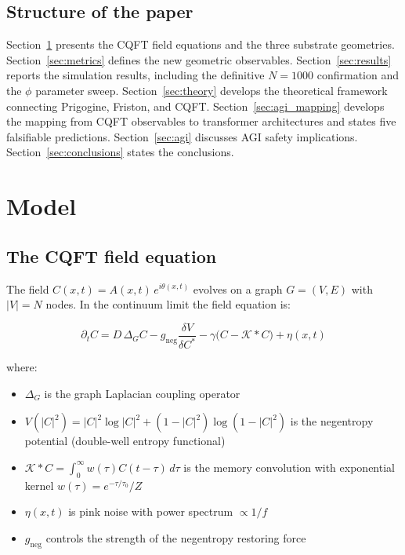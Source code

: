 \documentclass[12pt,a4paper]{article}
\theoremstyle{plain}
\theoremstyle{definition}
\begin{document}
\subsection{Structure of the paper}

Section~\ref{sec:model} presents the CQFT field equations and the three
substrate geometries. Section~\ref{sec:metrics} defines the new geometric
observables. Section~\ref{sec:results} reports the simulation results,
including the definitive $N=1000$ confirmation and the $\phi$ parameter sweep.
Section~\ref{sec:theory} develops the theoretical framework connecting
Prigogine, Friston, and CQFT.
Section~\ref{sec:agi_mapping} develops the mapping from CQFT observables
to transformer architectures and states five falsifiable predictions.
Section~\ref{sec:agi} discusses AGI safety implications.
Section~\ref{sec:conclusions} states the conclusions.

\section{Model}
\label{sec:model}

\subsection{The CQFT field equation}

The field $C(x,t) = A(x,t)\,e^{i\theta(x,t)}$ evolves on a graph
$G = (V, E)$ with $|V| = N$ nodes. In the continuum limit the field
equation is:

\begin{equation}
\label{eq:field}
\partial_t C = D\,\Delta_G C
  - g_{\text{neg}}\frac{\delta V}{\delta C^*}
  - \gamma\bigl(C - \mathcal{K} * C\bigr)
  + \eta(x,t)
\end{equation}

where:
\begin{itemize}[noitemsep]
  \item $\Delta_G$ is the graph Laplacian coupling operator
  \item $V(|C|^2) = |C|^2\log|C|^2 + (1-|C|^2)\log(1-|C|^2)$ is the
    negentropy potential (double-well entropy functional)
  \item $\mathcal{K} * C = \int_0^\infty w(\tau)C(t-\tau)\,d\tau$ is the
    memory convolution with exponential kernel $w(\tau) = e^{-\tau/\tau_0}/Z$
  \item $\eta(x,t)$ is pink noise with power spectrum $\propto 1/f$
  \item $g_{\text{neg}}$ controls the strength of the negentropy restoring force
\end{itemize}
\end{document}

